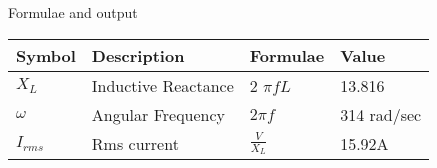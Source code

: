\setlength{\arrayrulewidth}{0.3mm}
\setlength{\tabcolsep}{12pt}
\renewcommand{\arraystretch}{1.3}


\begin{center}
\caption{Formulae and output}
\begin{tabular}{ |p{1.5cm}|p{1.5cm}|p{1.5cm}|p{1.5cm}|  }

\hline
{Symbol} & {Description} & {Formulae} & {Value} \\
\hline
$X_{L}$ & Inductive Reactance & 2 $\pi fL$ & 13.816 \\
\hline
$\omega$ & Angular Frequency & $2\pi f$ & 314 rad/sec \\
\hline
$I_{rms}$ & Rms current & $\frac{V}{X_{L}}$ & 15.92A \\
\hline


\end{tabular}
\end{center}

